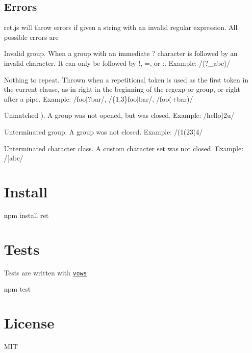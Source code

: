 \subsection*{Errors}

ret.\+js will throw errors if given a string with an invalid regular expression. All possible errors are


\begin{DoxyItemize}
\item Invalid group. When a group with an immediate {\ttfamily ?} character is followed by an invalid character. It can only be followed by {\ttfamily !}, {\ttfamily =}, or {\ttfamily \+:}. Example\+: {\ttfamily /(?\+\_\+abc)/}
\item Nothing to repeat. Thrown when a repetitional token is used as the first token in the current clause, as in right in the beginning of the regexp or group, or right after a pipe. Example\+: {\ttfamily /foo$\vert$?bar/}, {\ttfamily /\{1,3\}foo$\vert$bar/}, {\ttfamily /foo(+bar)/}
\item Unmatched ). A group was not opened, but was closed. Example\+: {\ttfamily /hello)2u/}
\item Unterminated group. A group was not closed. Example\+: {\ttfamily /(1(23)4/}
\item Unterminated character class. A custom character set was not closed. Example\+: {\ttfamily /\mbox{[}abc/}
\end{DoxyItemize}

\section*{Install}

\begin{DoxyVerb}npm install ret
\end{DoxyVerb}


\section*{Tests}

Tests are written with \href{http://vowsjs.org/}{\tt vows}


\begin{DoxyCode}
npm test
\end{DoxyCode}


\section*{License}

M\+IT 